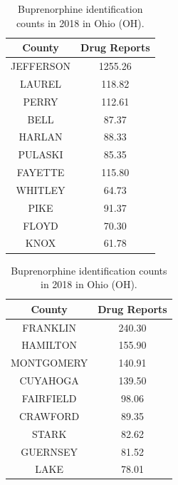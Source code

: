 \documentclass{mcmthesis}
\begin{document}
\begin{table}[H]
 \caption{Source Dedection and Future Prediction}
  \label{tbl:main}
  \begin{subtable}[t]{0.45\linewidth}
    \centering
     \caption{Hydrocodone identification counts in 2008 in  Kentucky (KY).}
    \label{tab:2008}
    \begin{tabular}{|c|c|}
        \hline
        County  &  Drug Reports  \\\hline
        JEFFERSON &  1255.26\\
        LAUREL &  118.82\\
        PERRY & 112.61\\
        BELL &  87.37\\
        HARLAN & 88.33\\
        PULASKI &  85.35\\
        FAYETTE &  115.80\\
        WHITLEY &  64.73\\
        PIKE &  91.37\\
        FLOYD &  70.30\\
        KNOX & 61.78\\
        \hline
    \end{tabular}
   

  \end{subtable}\hfill
  \begin{subtable}[t]{0.45\linewidth}
    \centering
    \caption{Buprenorphine identification counts in 2018 in Ohio (OH).}
    \label{2018}
    \begin{tabular}{|c|c|}
        \hline
        County &   Drug Reports\\\hline       
        FRANKLIN & 240.30\\
        HAMILTON & 155.90\\
        MONTGOMERY & 140.91\\
        CUYAHOGA & 139.50\\
        FAIRFIELD & 98.06\\
        CRAWFORD & 89.35\\
        STARK & 82.62\\
        GUERNSEY & 81.52\\
        LAKE & 78.01\\
        \hline
    \end{tabular}
  \end{subtable}
\end{table}
\end{document}
